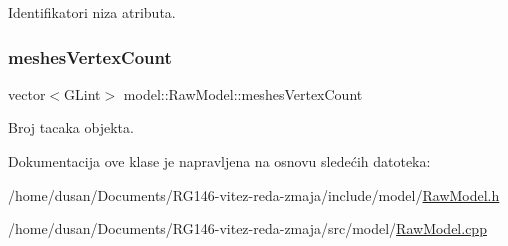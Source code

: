 Identifikatori niza atributa. 

\mbox{\label{classmodel_1_1RawModel_a9a6ad9eb37bd6453ec115c2195d7f8a2}} 
\subsubsection{\texorpdfstring{meshes\+Vertex\+Count}{meshesVertexCount}}
{\footnotesize\ttfamily vector$<$G\+Lint$>$ model\+::\+Raw\+Model\+::meshes\+Vertex\+Count\hspace{0.3cm}{\ttfamily [private]}}



Broj tacaka objekta. 



Dokumentacija ove klase je napravljena na osnovu sledećih datoteka\+:\begin{DoxyCompactItemize}
\item 
/home/dusan/\+Documents/\+R\+G146-\/vitez-\/reda-\/zmaja/include/model/\hyperlink{RawModel_8h}{Raw\+Model.\+h}\item 
/home/dusan/\+Documents/\+R\+G146-\/vitez-\/reda-\/zmaja/src/model/\hyperlink{RawModel_8cpp}{Raw\+Model.\+cpp}\end{DoxyCompactItemize}
